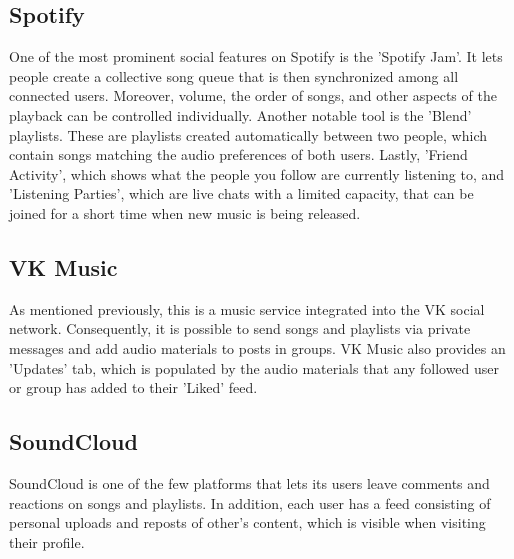 \subsection{Spotify}
One of the most prominent social features on Spotify is the 'Spotify Jam'\cite{spotify_jam}.
It lets people create a collective song queue that is then synchronized among all connected users.
Moreover, volume, the order of songs, and other aspects of the playback can be controlled individually.
Another notable tool is the 'Blend' playlists\cite{spotify_recs}. These are playlists created automatically
between two people, which contain songs matching the audio preferences of both users.
Lastly, 'Friend Activity'\cite{spotify_friend_activ}, which shows what the people you follow are currently listening to,
and 'Listening Parties', which are live chats with a limited capacity,
that can be joined for a short time when new music is being released\cite{spotify_party_1,spotify_party_2}.

\subsection{VK Music}
As mentioned previously, this is a music service integrated into the VK social network.
Consequently, it is possible to send songs and playlists via private messages and add audio materials to
posts in groups. VK Music also provides an 'Updates' tab, which is populated by the audio materials that
any followed user or group has added to their 'Liked' feed.

\subsection{SoundCloud}
SoundCloud is one of the few platforms that lets its users leave comments
and reactions on songs and playlists\cite{sc_comments,sc_reactions}.
In addition, each user has a feed consisting of personal uploads and
reposts of other's content\cite{sc_reposts}, which is visible when visiting their profile.

